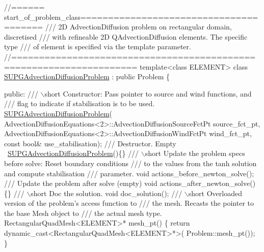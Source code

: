\begin{DoxyCodeInclude}
\textcolor{comment}{//====== start\_of\_problem\_class=======================================}\textcolor{comment}{}
\textcolor{comment}{/// 2D AdvectionDiffusion problem on rectangular domain, discretised }
\textcolor{comment}{/// with refineable 2D QAdvectionDiffusion elements. The specific type}
\textcolor{comment}{/// of element is specified via the template parameter.}
\textcolor{comment}{}\textcolor{comment}{//====================================================================}
\textcolor{keyword}{template}<\textcolor{keyword}{class} ELEMENT> 
\textcolor{keyword}{class }\hyperlink{classSUPGAdvectionDiffusionProblem}{SUPGAdvectionDiffusionProblem} : \textcolor{keyword}{public} Problem
\{

\textcolor{keyword}{public}:
\textcolor{comment}{}
\textcolor{comment}{ /// \(\backslash\)short Constructor: Pass pointer to source and wind functions, and}
\textcolor{comment}{ /// flag to indicate if stabilisation is to be used.}
\textcolor{comment}{} \hyperlink{classSUPGAdvectionDiffusionProblem}{SUPGAdvectionDiffusionProblem}(
  AdvectionDiffusionEquations<2>::AdvectionDiffusionSourceFctPt source\_fct\_pt,
  AdvectionDiffusionEquations<2>::AdvectionDiffusionWindFctPt wind\_fct\_pt,
  \textcolor{keyword}{const} \textcolor{keywordtype}{bool}& use\_stabilisation);
\textcolor{comment}{}
\textcolor{comment}{ /// Destructor. Empty}
\textcolor{comment}{} ~\hyperlink{classSUPGAdvectionDiffusionProblem}{SUPGAdvectionDiffusionProblem}()\{\}
\textcolor{comment}{}
\textcolor{comment}{ /// \(\backslash\)short Update the problem specs before solve: Reset boundary conditions}
\textcolor{comment}{ /// to the values from the tanh solution and compute stabilisation}
\textcolor{comment}{ /// parameter.}
\textcolor{comment}{} \textcolor{keywordtype}{void} actions\_before\_newton\_solve();
\textcolor{comment}{}
\textcolor{comment}{ /// Update the problem after solve (empty)}
\textcolor{comment}{} \textcolor{keywordtype}{void} actions\_after\_newton\_solve()\{\}
\textcolor{comment}{}
\textcolor{comment}{ /// \(\backslash\)short Doc the solution.}
\textcolor{comment}{} \textcolor{keywordtype}{void} doc\_solution();
\textcolor{comment}{}
\textcolor{comment}{ /// \(\backslash\)short Overloaded version of the problem's access function to }
\textcolor{comment}{ /// the mesh. Recasts the pointer to the base Mesh object to }
\textcolor{comment}{ /// the actual mesh type.}
\textcolor{comment}{} RectangularQuadMesh<ELEMENT>* mesh\_pt() 
  \{
   \textcolor{keywordflow}{return} \textcolor{keyword}{dynamic\_cast<}RectangularQuadMesh<ELEMENT>*\textcolor{keyword}{>}(
    Problem::mesh\_pt());
  \}


\end{DoxyCodeInclude}
